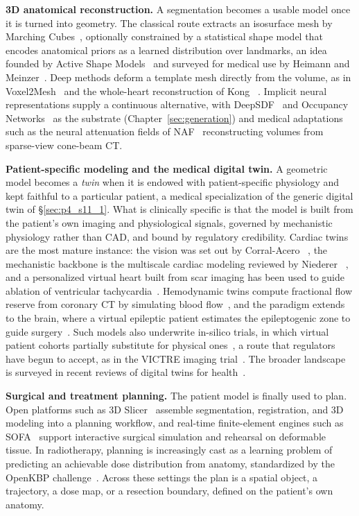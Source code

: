 \textbf{3D anatomical reconstruction.} A segmentation becomes a usable model once it is turned into geometry. 
The classical route extracts an isosurface mesh by Marching Cubes~\cite{lorensen1998marching}, optionally constrained by a statistical shape model that encodes anatomical priors as a learned distribution over landmarks, an idea founded by Active Shape Models~\cite{cootes1995asm} and surveyed for medical use by Heimann and Meinzer~\cite{heimann2009ssm}. 
Deep methods deform a template mesh directly from the volume, as in Voxel2Mesh~\cite{wickramasinghe2020voxel2mesh} and the whole-heart reconstruction of Kong \etal~\cite{kong2021meshdeformnet}. 
Implicit neural representations supply a continuous alternative, with DeepSDF~\cite{park2019deepsdf} and Occupancy Networks~\cite{mescheder2019occupancy} as the substrate (Chapter~\ref{sec:generation}) and medical adaptations such as the neural attenuation fields of NAF~\cite{zha2022naf} reconstructing volumes from sparse-view cone-beam CT.

\textbf{Patient-specific modeling and the medical digital twin.} A geometric model becomes a \emph{twin} when it is endowed with patient-specific physiology and kept faithful to a particular patient, a medical specialization of the generic digital twin of §\ref{sec:p4_s11_1}. 
What is clinically specific is that the model is built from the patient's own imaging and physiological signals, governed by mechanistic physiology rather than CAD, and bound by regulatory credibility. 
Cardiac twins are the most mature instance: the vision was set out by Corral-Acero \etal~\cite{corralacero2020digital}, the mechanistic backbone is the multiscale cardiac modeling reviewed by Niederer \etal~\cite{niederer2019cardiacmodels}, and a personalized virtual heart built from scar imaging has been used to guide ablation of ventricular tachycardia~\cite{prakosa2018personalized}. 
Hemodynamic twins compute fractional flow reserve from coronary CT by simulating blood flow~\cite{taylor2013ffrct}, and the paradigm extends to the brain, where a virtual epileptic patient estimates the epileptogenic zone to guide surgery~\cite{wang2023vep}. 
Such models also underwrite in-silico trials, in which virtual patient cohorts partially substitute for physical ones~\cite{viceconti2016avicenna}, a route that regulators have begun to accept, as in the VICTRE imaging trial~\cite{badano2018victre}. 
The broader landscape is surveyed in recent reviews of digital twins for health~\cite{katsoulakis2024digital}.

\textbf{Surgical and treatment planning.} The patient model is finally used to plan. 
Open platforms such as 3D Slicer~\cite{fedorov2012slicer} assemble segmentation, registration, and 3D modeling into a planning workflow, and real-time finite-element engines such as SOFA~\cite{faure2012sofa} support interactive surgical simulation and rehearsal on deformable tissue. 
In radiotherapy, planning is increasingly cast as a learning problem of predicting an achievable dose distribution from anatomy, standardized by the OpenKBP challenge~\cite{babier2021openkbp}. 
Across these settings the plan is a spatial object, a trajectory, a dose map, or a resection boundary, defined on the patient's own anatomy.


